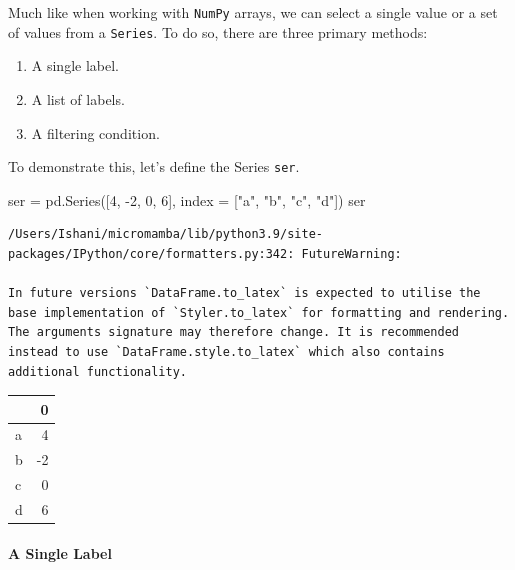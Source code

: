 \documentclass[
  letterpaper,
  DIV=11,
  numbers=noendperiod]{scrreprt}
\let\oldparagraph\paragraph
\renewcommand{\paragraph}[1]{\oldparagraph{#1}\mbox{}}
\newenvironment{Shaded}{\begin{snugshade}}{\end{snugshade}}
\newcommand{\DecValTok}[1]{\textcolor[rgb]{0.68,0.00,0.00}{#1}}
\newcommand{\NormalTok}[1]{\textcolor[rgb]{0.00,0.23,0.31}{#1}}
\newcommand{\OperatorTok}[1]{\textcolor[rgb]{0.37,0.37,0.37}{#1}}
\newcommand{\StringTok}[1]{\textcolor[rgb]{0.13,0.47,0.30}{#1}}
\providecommand{\tightlist}{%
  \setlength{\itemsep}{0pt}\setlength{\parskip}{0pt}}\usepackage{longtable,booktabs,array}
\begin{document}
Much like when working with \texttt{NumPy} arrays, we can select a
single value or a set of values from a \texttt{Series}. To do so, there
are three primary methods:

\begin{enumerate}
\def\labelenumi{\arabic{enumi}.}
\tightlist
\item
  A single label.
\item
  A list of labels.
\item
  A filtering condition.
\end{enumerate}

To demonstrate this, let's define the Series \texttt{ser}.

\begin{Shaded}
\begin{Highlighting}[]
\NormalTok{ser }\OperatorTok{=}\NormalTok{ pd.Series([}\DecValTok{4}\NormalTok{, }\OperatorTok{{-}}\DecValTok{2}\NormalTok{, }\DecValTok{0}\NormalTok{, }\DecValTok{6}\NormalTok{], index }\OperatorTok{=}\NormalTok{ [}\StringTok{"a"}\NormalTok{, }\StringTok{"b"}\NormalTok{, }\StringTok{"c"}\NormalTok{, }\StringTok{"d"}\NormalTok{])}
\NormalTok{ser}
\end{Highlighting}
\end{Shaded}

\begin{verbatim}
/Users/Ishani/micromamba/lib/python3.9/site-packages/IPython/core/formatters.py:342: FutureWarning:

In future versions `DataFrame.to_latex` is expected to utilise the base implementation of `Styler.to_latex` for formatting and rendering. The arguments signature may therefore change. It is recommended instead to use `DataFrame.style.to_latex` which also contains additional functionality.
\end{verbatim}

\begin{tabular}{lr}
\toprule
{} &  0 \\
\midrule
a &  4 \\
b & -2 \\
c &  0 \\
d &  6 \\
\bottomrule
\end{tabular}

\hypertarget{a-single-label}{%
\paragraph{A Single Label}\label{a-single-label}}
\end{document}
